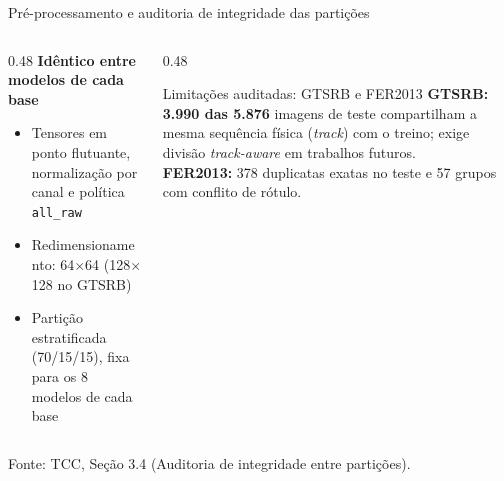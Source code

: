\documentclass[aspectratio=169,11pt,brazil]{beamer}
\newcommand{\fonte}[1]{\par\vfill{\tiny\color{gray}Fonte: #1\par}}
\begin{document}
\begin{frame}{Pré-processamento e auditoria de integridade das partições}
  \begin{columns}[T]
    \begin{column}{0.48\textwidth}
      \textbf{Idêntico entre modelos de cada base}
      \begin{itemize}
        \item Tensores em ponto flutuante, normalização por canal e política \texttt{all\_raw}
        \item Redimensionamento: 64$\times$64 (128$\times$128 no GTSRB)
        \item Partição estratificada (70/15/15), fixa para os 8 modelos de cada base
      \end{itemize}
    \end{column}
    \begin{column}{0.48\textwidth}
      \begin{alertblock}{Limitações auditadas: GTSRB e FER2013}
        \textbf{GTSRB:} \textbf{3.990 das 5.876} imagens de teste compartilham a mesma sequência física (\textit{track}) com o treino; exige divisão \textit{track-aware} em trabalhos futuros.\\[3pt]
        \textbf{FER2013:} 378 duplicatas exatas no teste e 57 grupos com conflito de rótulo.
      \end{alertblock}
    \end{column}
  \end{columns}
  \fonte{TCC, Seção 3.4 (Auditoria de integridade entre partições).}
\end{frame}
\end{document}
